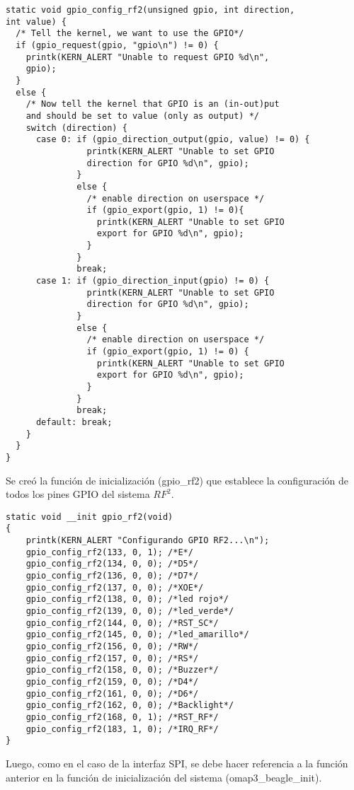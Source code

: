 \begin{verbatim}
static void gpio_config_rf2(unsigned gpio, int direction, 
int value) {
  /* Tell the kernel, we want to use the GPIO*/
  if (gpio_request(gpio, "gpio\n") != 0) {
    printk(KERN_ALERT "Unable to request GPIO %d\n", 
    gpio);
  }
  else {
    /* Now tell the kernel that GPIO is an (in-out)put 
    and should be set to value (only as output) */
    switch (direction) {
      case 0: if (gpio_direction_output(gpio, value) != 0) {
                printk(KERN_ALERT "Unable to set GPIO 
                direction for GPIO %d\n", gpio);
              }
              else {
                /* enable direction on userspace */
                if (gpio_export(gpio, 1) != 0){ 
                  printk(KERN_ALERT "Unable to set GPIO 
                  export for GPIO %d\n", gpio);
                }
              }
              break;
      case 1: if (gpio_direction_input(gpio) != 0) {
                printk(KERN_ALERT "Unable to set GPIO 
                direction for GPIO %d\n", gpio);
              }
              else {
                /* enable direction on userspace */
                if (gpio_export(gpio, 1) != 0) { 
                  printk(KERN_ALERT "Unable to set GPIO 
                  export for GPIO %d\n", gpio);
                }
              }
              break;
      default: break;
    }
  }	
}
\end{verbatim}

Se creó la función de inicialización (gpio\_rf2) que establece la configuración de todos los pines GPIO del sistema $RF^{2}$.

\begin{verbatim}
static void __init gpio_rf2(void)
{
    printk(KERN_ALERT "Configurando GPIO RF2...\n");
    gpio_config_rf2(133, 0, 1); /*E*/
    gpio_config_rf2(134, 0, 0); /*D5*/
    gpio_config_rf2(136, 0, 0); /*D7*/
    gpio_config_rf2(137, 0, 0); /*XOE*/
    gpio_config_rf2(138, 0, 0); /*led rojo*/
    gpio_config_rf2(139, 0, 0); /*led_verde*/
    gpio_config_rf2(144, 0, 0); /*RST_SC*/
    gpio_config_rf2(145, 0, 0); /*led_amarillo*/
    gpio_config_rf2(156, 0, 0); /*RW*/
    gpio_config_rf2(157, 0, 0); /*RS*/
    gpio_config_rf2(158, 0, 0); /*Buzzer*/
    gpio_config_rf2(159, 0, 0); /*D4*/
    gpio_config_rf2(161, 0, 0); /*D6*/
    gpio_config_rf2(162, 0, 0); /*Backlight*/
    gpio_config_rf2(168, 0, 1); /*RST_RF*/
    gpio_config_rf2(183, 1, 0); /*IRQ_RF*/
}
\end{verbatim}

Luego, como en el caso de la interfaz SPI, se debe hacer referencia a la función anterior en la función de inicialización del sistema (omap3\_beagle\_init).

